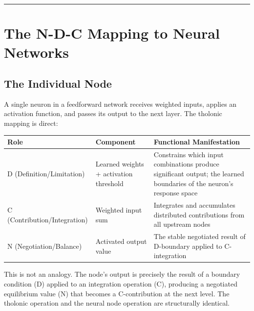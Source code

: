 \documentclass[12pt]{article}
\begin{document}
\begin{center}\rule{0.5\linewidth}{0.5pt}\end{center}

\section{The N-D-C Mapping to Neural Networks}\label{the-n-d-c-mapping-to-neural-networks}

\subsection{The Individual Node}\label{the-individual-node}

A single neuron in a feedforward network receives weighted inputs,
applies an activation function, and passes its output to the next layer.
The tholonic mapping is direct:

\begin{longtable}[]{@{}
  >{\raggedright\arraybackslash}p{}
  >{\raggedright\arraybackslash}p{}
  >{\raggedright\arraybackslash}p{}@{}}
\toprule\noalign{}
\begin{minipage}[b]{\linewidth}\raggedright
Role
\end{minipage} & \begin{minipage}[b]{\linewidth}\raggedright
Component
\end{minipage} & \begin{minipage}[b]{\linewidth}\raggedright
Functional Manifestation
\end{minipage} \\
\midrule\noalign{}
\endhead
\bottomrule\noalign{}
\endlastfoot
D (Definition/Limitation) & Learned weights + activation threshold &
Constrains which input combinations produce significant output; the
learned boundaries of the neuron's response space \\
C (Contribution/Integration) & Weighted input sum & Integrates and
accumulates distributed contributions from all upstream nodes \\
N (Negotiation/Balance) & Activated output value & The stable negotiated
result of D-boundary applied to C-integration \\
\end{longtable}

This is not an analogy. The node's output is precisely the result of a
boundary condition (D) applied to an integration operation (C),
producing a negotiated equilibrium value (N) that becomes a
C-contribution at the next level. The tholonic operation and the neural
node operation are structurally identical.
\end{document}
